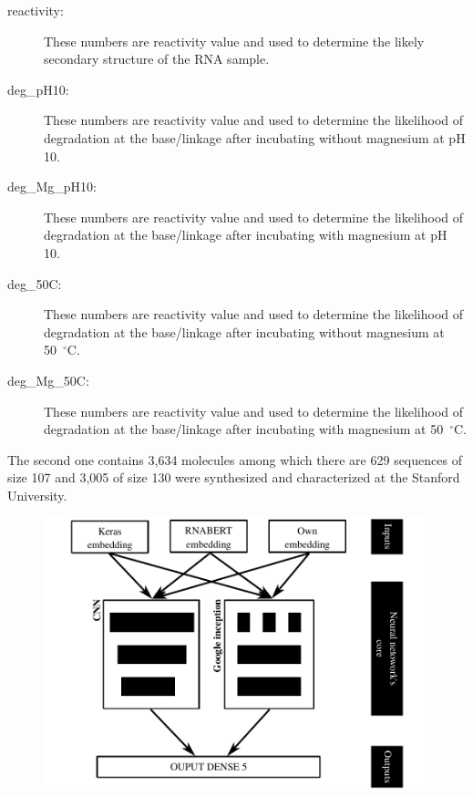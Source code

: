 \documentclass[12pt, oneside, a4paper]{report}
\begin{document}
\begin{multicols}{2}
\begin{description}
    \item[reactivity:] These numbers are reactivity value and used to determine the likely secondary structure of the RNA sample.
    \item[deg\_pH10:] These numbers are reactivity value and used to determine the likelihood of degradation at the base/linkage after incubating without magnesium at pH 10.
    \item[deg\_Mg\_pH10:] These numbers are reactivity value and used to determine the likelihood of degradation at the base/linkage after incubating with magnesium at  pH 10.
    \item[deg\_50C:] These numbers are reactivity value and used to determine the likelihood of degradation at the base/linkage after incubating without magnesium at  50~$^{\circ}$C.
    \item[deg\_Mg\_50C:] These numbers are reactivity value and used to determine the likelihood of degradation at the base/linkage after incubating with magnesium at  50~$^{\circ}$C.
\end{description}

The second one contains 3,634 molecules among which there are 629 sequences of size 107 and 3,005 of size 130 were synthesized and characterized at the Stanford University.

\begin{figure}[!tb]
    \centering
    \includegraphics[width=\textwidth]{figure/Scheme_neural_network.pdf}
        
    \small
    \vspace{0.5ex}
    

\end{figure}
\end{multicols}
\end{document}
